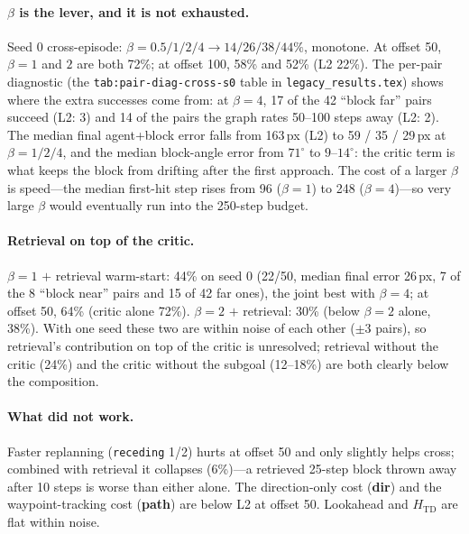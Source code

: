 \documentclass[11pt]{article}
\newcommand{\Htd}{H_{\mathrm{TD}}}
\begin{document}
\paragraph{$\beta$ is the lever, and it is not exhausted.} Seed 0 cross-episode:
$\beta=0.5/1/2/4 \to 14/26/38/44\%$, monotone. At offset 50, $\beta=1$ and $2$ are both
72\%; at offset 100, 58\% and 52\% (L2 22\%). The per-pair diagnostic
(the \texttt{tab:pair-diag-cross-s0} table in \texttt{legacy\_results.tex}) shows where the extra successes come from: at $\beta=4$, 17
of the 42 ``block far'' pairs succeed (L2: 3) and 14 of the pairs the graph rates 50--100
steps away (L2: 2). The median final agent+block error falls from 163\,px (L2) to 59 / 35 /
29\,px at $\beta=1/2/4$, and the median block-angle error from $71^\circ$ to $9$--$14^\circ$:
the critic term is what keeps the block from drifting after the first approach. The cost of
a larger $\beta$ is speed---the median first-hit step rises from 96 ($\beta=1$) to 248
($\beta=4$)---so very large $\beta$ would eventually run into the 250-step budget.

\paragraph{Retrieval on top of the critic.} $\beta=1$ $+$ retrieval warm-start: 44\% on seed
0 (22/50, median final error 26\,px, 7 of the 8 ``block near'' pairs and 15 of 42 far ones),
the joint best with $\beta=4$; at offset 50, 64\% (critic alone 72\%). $\beta=2$ $+$
retrieval: 30\% (below $\beta=2$ alone, 38\%). With one seed these two are within noise of
each other ($\pm$3 pairs), so retrieval's contribution on top of the critic is unresolved;
retrieval without the critic (24\%) and the critic without the subgoal (12--18\%) are both
clearly below the composition.

\paragraph{What did not work.} Faster replanning (\texttt{receding} 1/2) hurts at offset 50
and only slightly helps cross; combined with retrieval it collapses (6\%)---a retrieved
25-step block thrown away after 10 steps is worse than either alone. The direction-only cost
(\textbf{dir}) and the waypoint-tracking cost (\textbf{path}) are below L2 at offset 50.
Lookahead and $\Htd$ are flat within noise.
\end{document}
